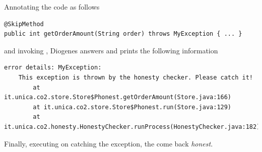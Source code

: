 Annotating the code as follows
\begin{mdframed}
\begin{verbatim}
@SkipMethod
public int getOrderAmount(String order) throws MyException { ... }
\end{verbatim}
\end{mdframed}

and invoking ,
Diogenes answers  and prints the following information
\begin{mdframed}
\begin{verbatim}
error details: MyException: 
    This exception is thrown by the honesty checker. Please catch it!
        at it.unica.co2.store.Store$Phonest.getOrderAmount(Store.java:166)
        at it.unica.co2.store.Store$Phonest.run(Store.java:129)
        at it.unica.co2.honesty.HonestyChecker.runProcess(HonestyChecker.java:182)
\end{verbatim}
\end{mdframed}
Finally, executing  on catching the exception,
the come back \emph{honest}.






